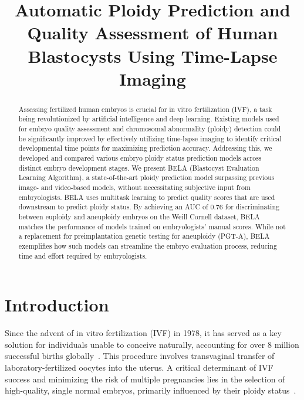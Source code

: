 \documentclass[12pt]{article}
\title{Automatic Ploidy Prediction and Quality Assessment of Human Blastocysts Using Time-Lapse Imaging}
\date{}
\begin{document}
\maketitle

\begin{abstract}
Assessing fertilized human embryos is crucial for in vitro fertilization (IVF), a task being revolutionized by artificial intelligence and deep learning. Existing models used for embryo quality assessment and chromosomal abnormality (ploidy) detection could be significantly improved by effectively utilizing time-lapse imaging to identify critical developmental time points for maximizing prediction accuracy. Addressing this, we developed and compared various embryo ploidy status prediction models across distinct embryo development stages. We present BELA (Blastocyst Evaluation Learning Algorithm), a state-of-the-art ploidy prediction model surpassing previous image- and video-based models, without necessitating subjective input from embryologists. BELA uses multitask learning to predict quality scores that are used downstream to predict ploidy status. By achieving an AUC of 0.76 for discriminating between euploidy and aneuploidy embryos on the Weill Cornell dataset, BELA matches the performance of models trained on embryologists' manual scores. While not a replacement for preimplantation genetic testing for aneuploidy (PGT-A), BELA exemplifies how such models can streamline the embryo evaluation process, reducing time and effort required by embryologists.
\end{abstract}

\section{Introduction}

Since the advent of in vitro fertilization (IVF) in 1978, it has served as a key solution for individuals unable to conceive naturally, accounting for over 8 million successful births globally~\citep{steptoe1978birth, chambers2021ivfglobal}. This procedure involves transvaginal transfer of laboratory-fertilized oocytes into the uterus. A critical determinant of IVF success and minimizing the risk of multiple pregnancies lies in the selection of high-quality, single normal embryos, primarily influenced by their ploidy status~\citep{scott2013blastocyst, neal2018effect}.
\end{document}
